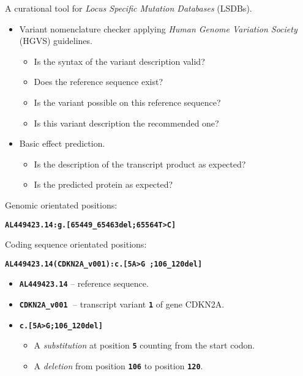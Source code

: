 \documentclass[a4, portrait]{seminar}
\newcommand{\bt}[1]{\texttt{\textbf{#1}}}
\begin{document}
\begin{slide}
  
  A curational tool for \emph{Locus Specific Mutation Databases} (LSDBs).
  
  \bigskip
  \begin{itemize}
    \item Variant nomenclature checker applying \emph{Human Genome Variation
          Society} (HGVS) guidelines.
    \begin{itemize}
      \item Is the syntax of the variant description valid?
      \item Does the reference sequence exist?
      \item Is the variant possible on this reference sequence?
      \item Is this variant description the recommended one?
    \end{itemize}
    \item Basic effect prediction.
    \begin{itemize}
      \item Is the description of the transcript product as expected?
      \item Is the predicted protein as expected?
    \end{itemize}
  \end{itemize}
  \vfill
\end{slide}

\begin{slide}

    Genomic orientated positions:
    \begin{center}
      \bt{AL449423.14:g.[65449\_65463del;65564\yellow T\white >\yellow C\white]}
    \end{center}
    \bigskip
    Coding sequence orientated positions:
    \begin{center}
      \bt{AL449423.14(CDKN2A\_v001):c.[5\yellow A\white >\yellow G\white
        ;106\_120del]}
    \end{center}
    \bigskip
    \begin{itemize}
      \item \bt{AL449423.14} -- reference sequence.
      \item \bt{CDKN2A\_v001}$\;$ -- transcript variant \bt{1} of gene CDKN2A.
      \item \bt{c.[5\yellow A\white >\yellow G\white ;106\_120del]} 
      \begin{itemize}
        \item A \emph{substitution} at position \bt{5} counting from the start
          codon.
        \item A \emph{deletion} from position \bt{106} to position \bt{120}.
      \end{itemize}
    \end{itemize}
  
  \vfill
\end{slide}
\end{document}
